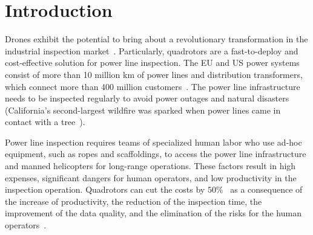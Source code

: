 \section{Introduction} \label{sec:Introduction}
%

%


Drones exhibit the potential to bring about a revolutionary transformation in the industrial inspection market~\cite{DroneiiWP18, eu}. Particularly, quadrotors are a fast-to-deploy and cost-effective solution for power line inspection. The EU and US power systems consist of more than 10 million km of power lines and distribution transformers, which connect more than 400 million customers~\cite{USEnergy, EUEnergy}. The power line infrastructure needs to be inspected regularly to avoid power outages and natural disasters (California's second-largest wildfire was sparked when power lines came in contact with a tree~\cite{Wildfire}).

Power line inspection requires teams of specialized human labor who use ad-hoc equipment, such as ropes and scaffoldings, to access the power line infrastructure and manned helicopters for long-range operations. These factors result in high expenses, significant dangers for human operators, and low productivity in the inspection operation.
Quadrotors can cut the costs by $50\%$~\cite{DroneiiWP18} as a consequence of the increase of productivity, the reduction of the inspection time, the improvement of the data quality, and the elimination of the risks for the human operators~\cite{DanishUAS2016}.

